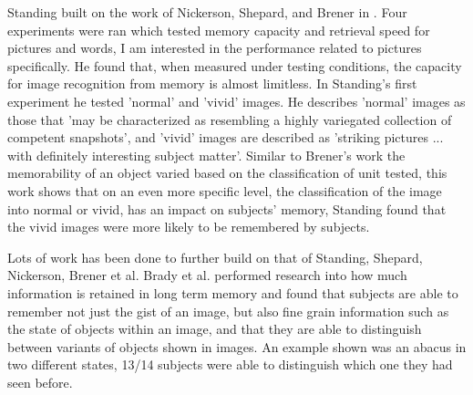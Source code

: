 \documentclass{UoYCSproject}
\begin{document}
Standing built on the work of Nickerson, Shepard, and Brener in \cite{standing10000pictures}. Four experiments were ran which tested memory capacity and retrieval speed for pictures and words, I am interested in the performance related to pictures specifically. He found that, when measured under testing conditions, the capacity for image recognition from memory is almost limitless. In Standing's first experiment he tested 'normal' and 'vivid' images. He describes 'normal' images as those that 'may be characterized as resembling a highly variegated collection of competent snapshots'\cite[p.208]{standing10000pictures}, and 'vivid' images are described as 'striking pictures ... with definitely interesting subject matter'\cite[p.208]{standing10000pictures}. Similar to Brener's work \cite{BrenerMemorySpan} the memorability of an object varied based on the classification of unit tested, this work shows that on an even more specific level, the classification of the image into normal or vivid, has an impact on subjects' memory, Standing found that the vivid images were more likely to be remembered by subjects.


Lots of work has been done to further build on that of Standing, Shepard, Nickerson, Brener et al. Brady et al. \cite{brady2008visual} performed research into how much information is retained in long term memory and found that subjects are able to remember not just the gist of an image, but also fine grain information such as the state of objects within an image, and that they are able to distinguish between variants of objects shown in images. An example shown was an abacus in two different states, 13/14 subjects were able to distinguish which one they had seen before.
\end{document}
